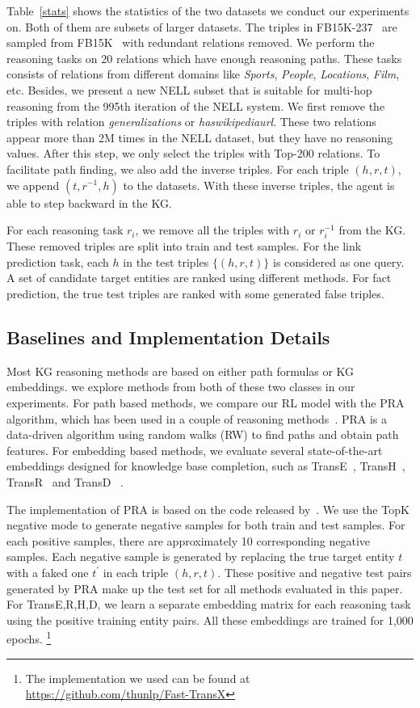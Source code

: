 \documentclass[11pt,letterpaper]{article}
\begin{document}
Table~\ref{stats} shows the statistics of the two datasets we conduct our experiments on. Both of them are subsets of larger datasets. The triples in FB15K-237~\cite{toutanova2015representing} are sampled from FB15K~\cite{bordes2013translating} with redundant relations removed. We perform the reasoning tasks on 20 relations which have enough reasoning paths. These tasks consists of relations from different domains like \textit{Sports}, \textit{People}, \textit{Locations}, \textit{Film}, etc. Besides, we present a new NELL subset that is suitable for multi-hop reasoning from the 995th iteration of the NELL system. We first remove the triples with relation \textit{generalizations} or \textit{haswikipediaurl}. These two relations appear more than 2M times in the NELL dataset, but they have no reasoning values. After this step, we only select the triples with Top-200 relations. To facilitate path finding, we also add the inverse triples. For each triple $(h,r,t)$, we append $(t,r^{-1},h)$ to the datasets. With these inverse triples, the agent is able to step backward in the KG.

For each reasoning task $r_{i}$, we remove all the triples with $r_i$ or $r_i^{-1}$ from the KG. These removed triples are split into train and test samples. For the link prediction task, each $h$ in the test triples $\{(h,r,t)\}$ is considered as one query. A set of candidate target entities are ranked using different methods. For fact prediction, the true test triples are ranked with some generated false triples.

\subsection{Baselines and Implementation Details}
Most KG reasoning methods are based on either path formulas or KG embeddings. we explore methods from both of these two classes in our experiments. For path based methods, we compare our RL model with the PRA~\cite{lao2011random} algorithm, which has been used in a couple of reasoning methods~\cite{gardner2013improving,neelakantan2015compositional}. PRA is a data-driven algorithm using random walks (RW) to find paths and obtain path features. For embedding based methods, we evaluate several state-of-the-art embeddings designed for knowledge base completion, such as  TransE~\cite{bordes2013translating}, TransH~\cite{wang2014knowledge}, TransR~\cite{lin2015learning} and TransD~\cite{ji2015knowledge} .

The implementation of PRA is based on the code released by~\cite{lao2011random}. We use the TopK negative mode to generate negative samples for both train and test samples. For each positive samples, there are approximately 10 corresponding negative samples. Each negative sample is generated by replacing the true target entity $t$ with a faked one $t^{'}$ in each triple $(h,r,t)$. These positive and negative test pairs generated by PRA make up the test set for all methods evaluated in this paper. For Trans{E,R,H,D}, we learn a separate embedding matrix for each reasoning task using the positive training entity pairs. All these embeddings are trained for 1,000 epochs. \footnote{The implementation we used can be found at \url{https://github.com/thunlp/Fast-TransX}}
\end{document}

